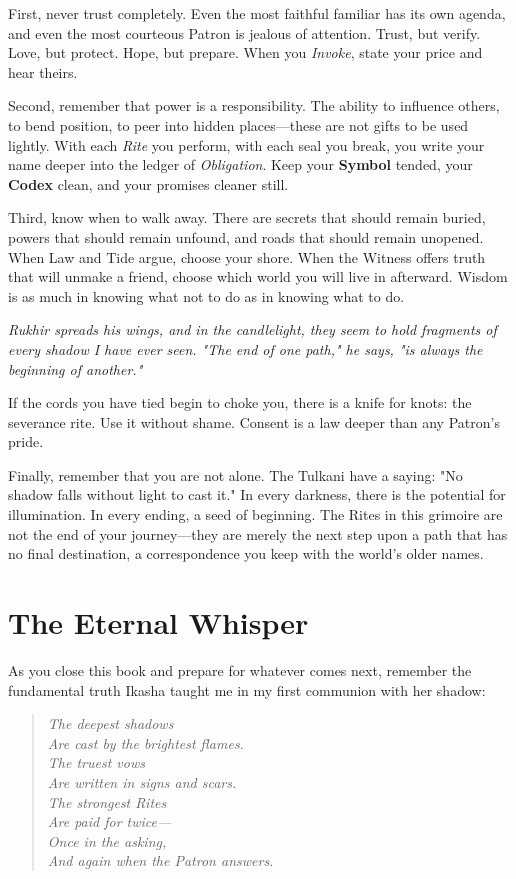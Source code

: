 \documentclass[12pt,twoside]{book}
\newcommand{\shadow}[1]{\textit{#1}}
\begin{document}
First, never trust completely. Even the most faithful familiar has its own agenda, and even the most courteous Patron is jealous of attention. Trust, but verify. Love, but protect. Hope, but prepare. When you \emph{Invoke}, state your price and hear theirs.

Second, remember that power is a responsibility. The ability to influence others, to bend position, to peer into hidden places—these are not gifts to be used lightly. With each \emph{Rite} you perform, with each seal you break, you write your name deeper into the ledger of \emph{Obligation}. Keep your \textbf{Symbol} tended, your \textbf{Codex} clean, and your promises cleaner still.

Third, know when to walk away. There are secrets that should remain buried, powers that should remain unfound, and roads that should remain unopened. When Law and Tide argue, choose your shore. When the Witness offers truth that will unmake a friend, choose which world you will live in afterward. Wisdom is as much in knowing what not to do as in knowing what to do.

\shadow{Rukhir spreads his wings, and in the candlelight, they seem to hold fragments of every shadow I have ever seen. "The end of one path," he says, "is always the beginning of another."}

If the cords you have tied begin to choke you, there is a knife for knots: the severance rite. Use it without shame. Consent is a law deeper than any Patron's pride.

Finally, remember that you are not alone. The Tulkani have a saying: "No shadow falls without light to cast it." In every darkness, there is the potential for illumination. In every ending, a seed of beginning. The Rites in this grimoire are not the end of your journey—they are merely the next step upon a path that has no final destination, a correspondence you keep with the world's older names.

\section*{The Eternal Whisper}

As you close this book and prepare for whatever comes next, remember the fundamental truth Ikasha taught me in my first communion with her shadow:

\begin{verse}
\textit{The deepest shadows} \\
\textit{Are cast by the brightest flames.} \\
\textit{The truest vows} \\
\textit{Are written in signs and scars.} \\
\textit{The strongest Rites} \\
\textit{Are paid for twice—} \\
\textit{Once in the asking,} \\
\textit{And again when the Patron answers.}
\end{verse}
\end{document}
